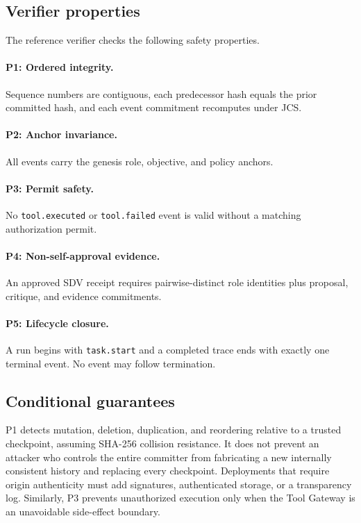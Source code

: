 \documentclass{article}
\begin{document}
\subsection{Verifier properties}

The reference verifier checks the following safety properties.

\paragraph{P1: Ordered integrity.}
Sequence numbers are contiguous, each predecessor hash equals the prior committed
hash, and each event commitment recomputes under JCS.

\paragraph{P2: Anchor invariance.}
All events carry the genesis role, objective, and policy anchors.

\paragraph{P3: Permit safety.}
No \texttt{tool.executed} or \texttt{tool.failed} event is valid without a
matching authorization permit.

\paragraph{P4: Non-self-approval evidence.}
An approved SDV receipt requires pairwise-distinct role identities plus proposal,
critique, and evidence commitments.

\paragraph{P5: Lifecycle closure.}
A run begins with \texttt{task.start} and a completed trace ends with exactly
one terminal event. No event may follow termination.

\subsection{Conditional guarantees}

P1 detects mutation, deletion, duplication, and reordering relative to a trusted
checkpoint, assuming SHA-256 collision resistance. It does not prevent an
attacker who controls the entire committer from fabricating a new internally
consistent history and replacing every checkpoint. Deployments that require
origin authenticity must add signatures, authenticated storage, or a transparency
log. Similarly, P3 prevents unauthorized execution only when the Tool Gateway is
an unavoidable side-effect boundary.
\end{document}
